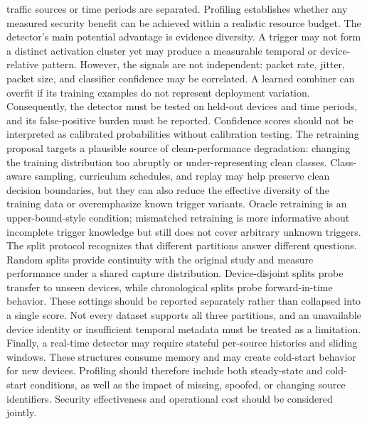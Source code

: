 \documentclass[11pt]{article}
\begin{document}
traffic sources or time periods are separated. Profiling establishes whether any measured security benefit can be achieved within a realistic resource budget. The detector's main potential advantage is evidence diversity. A trigger may not form a distinct activation cluster yet may produce a measurable temporal or device-relative pattern. However, the signals are not independent: packet rate, jitter, packet size, and classifier confidence may be correlated. A learned combiner can overfit if its training examples do not represent deployment variation. Consequently, the detector must be tested on held-out devices and time periods, and its false-positive burden must be reported. Confidence scores should not be interpreted as calibrated probabilities without calibration testing. The retraining proposal targets a plausible source of clean-performance degradation: changing the training distribution too abruptly or under-representing clean classes. Class-aware sampling, curriculum schedules, and replay may help preserve clean decision boundaries, but they can also reduce the effective diversity of the training data or overemphasize known trigger variants. Oracle retraining is an upper-bound-style condition; mismatched retraining is more informative about incomplete trigger knowledge but still does not cover arbitrary unknown triggers. The split protocol recognizes that different partitions answer different questions. Random splits provide continuity with the original study and measure performance under a shared capture distribution. Device-disjoint splits probe transfer to unseen devices, while chronological splits probe forward-in-time behavior. These settings should be reported separately rather than collapsed into a single score. Not every dataset supports all three partitions, and an unavailable device identity or insufficient temporal metadata must be treated as a limitation. Finally, a real-time detector may require stateful per-source histories and sliding windows. These structures consume memory and may create cold-start behavior for new devices. Profiling should therefore include both steady-state and cold-start conditions, as well as the impact of missing, spoofed, or changing source identifiers. Security effectiveness and operational cost should be considered jointly.
\end{document}
